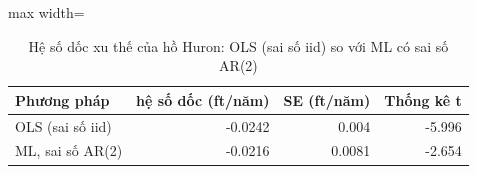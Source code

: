 \begin{table}[H]
\centering\small
\caption{Hệ số dốc xu thế của hồ Huron: OLS (sai số iid) so với ML có sai số AR(2)}\label{tab:tab_b11_03_slope_se}
\begin{adjustbox}{max width=\linewidth}
\begin{tabular}{lrrr}
\toprule
Phương pháp & hệ số dốc (ft/năm) & SE (ft/năm) & Thống kê t \\
\midrule
OLS (sai số iid) & -0.0242 & 0.004 & -5.996 \\
ML, sai số AR(2) & -0.0216 & 0.0081 & -2.654 \\
\bottomrule
\end{tabular}
\end{adjustbox}
\end{table}
